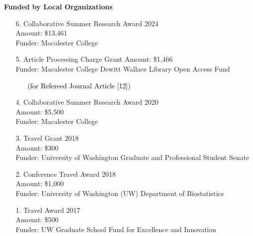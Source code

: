 \documentclass[margin]{res}
\newcommand{\annotateItem}[1]{
	\begin{itemize} \vspace{-0.1cm}
	\item[] 
	\begin{footnotesize}\textcolor{black}{(#1)}\end{footnotesize}
	\end{itemize} \vspace{-0.1cm}
}
\begin{document}
\begin{resume}
\textbf{Funded by Local Organizations} 
\begin{itemize}
\item[6.] Collaborative Summer Research Award \hfill 2024 \\
Amount: \$13,461\\
Funder: Macalester College


\item[5.] Article Processing Charge Grant %
Amount: \$1,466 \\
Funder: Macalester College Dewitt Wallace Library Open Access Fund
  \annotateItem{for Refereed Journal Article [12]}
  


\item[4.] Collaborative Summer Research Award  \hfill 2020 \\ %
Amount:  \$5,500 \\
Funder: Macalester College

\item[3.] Travel Grant  \hfill 2018 \\ 
Amount: \$300 \\
Funder: University of Washington Graduate and Professional Student Senate 

\item[2.] Conference Travel Award \hfill 2018 \\
Amount: \$1,000 \\
Funder: University of Washington (UW) Department of Biostatistics

\item[1.] Travel Award \hfill 2017 \\
Amount: \$500 \\
Funder: UW Graduate School Fund for Excellence and Innovation \\
\end{itemize}






\end{resume}
\end{document}
